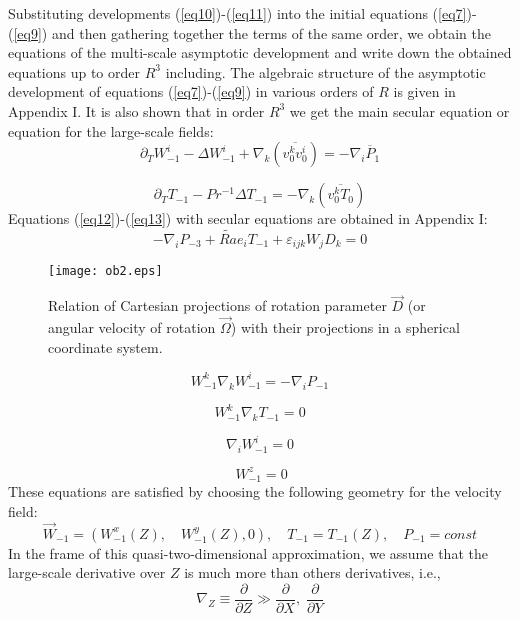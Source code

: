 \documentclass [12pt]{article}
\begin{document}
Substituting developments (\ref{eq10})-(\ref{eq11}) into the initial equations (\ref{eq7})-(\ref{eq9}) and then gathering together the terms of the same order, we obtain the equations of the multi-scale asymptotic development and write down the obtained equations up to order $R^{3}$ including.  The algebraic structure of the asymptotic development of equations (\ref{eq7})-(\ref{eq9}) in various orders of $R$ is given in Appendix I. It is also shown that in order  $R^{3} $   we get the main secular equation or equation for the large-scale fields:
\begin{equation} \label{eq12} \partial _{T} W_{-1}^{i} -\Delta W_{-1}^{i}
+\nabla _{k} \left(\overline{v_{0}^{k} v_{0}^{i} }\right)=-\nabla _{i} \overline{P}_{1}  \end{equation}

\begin{equation}
\label{eq13} \partial _{T} T_{-1} -Pr^{-1} \Delta T_{-1} =-\nabla _{k} \left(
\overline{v_{0}^{k} T_{0} }\right) \end{equation}
Equations (\ref{eq12})-(\ref{eq13}) with secular equations are obtained in Appendix I:
\[ -\nabla _{i} P_{-3} +\widetilde{Ra}e_{i} T_{-1}
+\varepsilon _{ijk} W_{j} D_{k} =0 \]

\begin{figure}
  \centering
    \texttt{[image: ob2.eps]}\\
  \caption{Relation of Cartesian projections of rotation parameter  $\vec{D}$ (or angular velocity  of rotation  $\vec{\Omega}$) with their projections in a spherical coordinate system.}\label{fg2}
\end{figure}


\[ W_{-1}^{k} \nabla _{k} W_{-1}^{i} =-\nabla
_{i} P_{-1}  \]

\[ W_{-1}^{k} \nabla _{k} T_{-1} =0 \]

\[ \nabla _{i} W_{-1}^{i} =0   \]

\[ \ W_{-1}^{z}=0  \]
These equations are satisfied by choosing the following geometry for the velocity field:
\begin{equation} \label{eq14}
 \vec{W}_{-1} =\left(W_{-1}^{x} \left(Z\right), \quad W_{-1}^{y}
\left(Z\right),0\right),  \quad T_{-1} =T_{-1} \left(Z\right), \quad P_{-1}
=const
\end{equation}
In the frame of this quasi-two-dimensional approximation, we assume that the large-scale derivative over $Z$ is much more than others derivatives, i.e.,
\[\nabla _{Z} \equiv \frac{\partial }{\partial Z} \gg \frac{\partial }{\partial X}
,\; \frac{\partial }{\partial Y} \]
\end{document}
